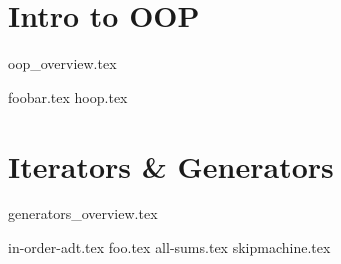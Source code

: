 \documentclass{exam}
\begin{document}
\newpage
\section{Intro to OOP}
{oop_overview.tex}
\begin{questions}
    {foobar.tex}
    {hoop.tex}
\end{questions}

\newpage
\section{Iterators \& Generators}
{generators_overview.tex}
\begin{questions}
    {in-order-adt.tex}
    {foo.tex}
    {all-sums.tex}
    {skipmachine.tex}
\end{questions}
\end{document}
